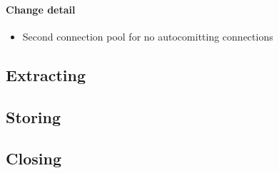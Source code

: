 \paragraph{Change detail}
\begin{itemize}
  \item Second connection pool for no autocomitting connections
\end{itemize}

\subsection{Extracting}


\subsection{Storing}

\subsection{Closing}







